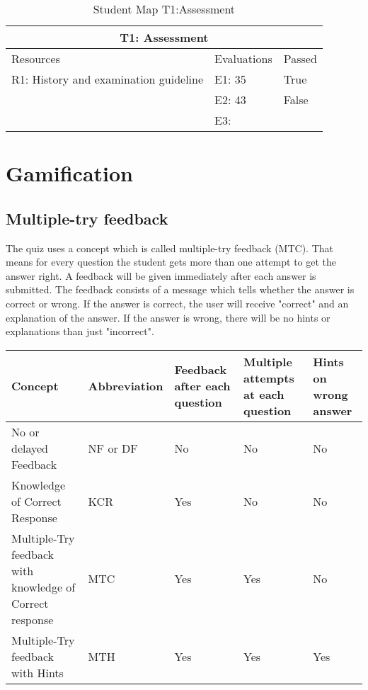 \begin{table}[h!]
	\caption{Student Map T1:Assessment}
	\label{table:StudentMap}
	\begin{tabular}{ | m{16em} | m{10em}| m{6em} | } 
		\hline
		\multicolumn{3}{c}{\bfseries T1: Assessment} \\
		\hline
		Resources & Evaluations & Passed \\
		\hline
		R1: History and examination guideline & E1: 35 & True \\
		& E2: 43 & False \\
		& E3: &  \\
		\hline
	\end{tabular}
\end{table}



\section{Gamification}
\subsection{Multiple-try feedback}
The quiz uses a concept which is called multiple-try feedback (MTC). That means for every question the student gets more than one attempt to get the answer right. A feedback will be given immediately after each answer is submitted. The feedback consists of a message which tells whether the answer is correct or wrong. If the answer is correct, the user will receive "correct" and an explanation of the answer. If the answer is wrong, there will be no hints or explanations than just "incorrect".

\begin{tabular}{ | m{10em} | m{6em}| m{6em} | m{6em} | m{5em} | } 
	\hline
	Concept & Abbreviation & Feedback after each question & Multiple attempts at each question & Hints on wrong answer \\ [0.5ex]
	\hline
No or delayed Feedback & NF or DF & No & No & No  \\
Knowledge of Correct Response & KCR  & Yes & No & No \\
Multiple-Try feedback with knowledge of Correct response  & MTC & Yes & Yes & No \\
Multiple-Try feedback with Hints & MTH & Yes & Yes & Yes \\
\hline
\end{tabular}


